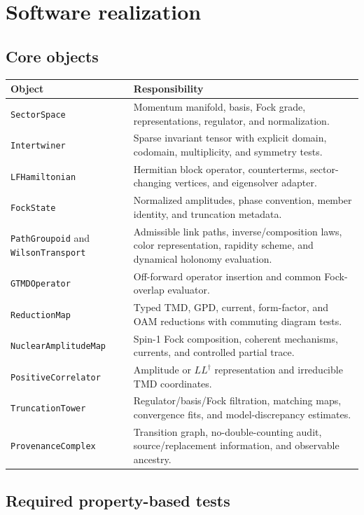 \documentclass[11pt]{article}
\begin{document}
\section{Software realization}

\subsection{Core objects}

\begin{longtable}{L{0.28\textwidth}L{0.64\textwidth}}
\toprule
Object & Responsibility\\
\midrule
\endhead
\texttt{SectorSpace} &
Momentum manifold, basis, Fock grade, representations, regulator, and
normalization.\\
\texttt{Intertwiner} &
Sparse invariant tensor with explicit domain, codomain, multiplicity, and
symmetry tests.\\
\texttt{LFHamiltonian} &
Hermitian block operator, counterterms, sector-changing vertices, and
eigensolver adapter.\\
\texttt{FockState} &
Normalized amplitudes, phase convention, member identity, and truncation
metadata.\\
\texttt{PathGroupoid} and \texttt{WilsonTransport} &
Admissible link paths, inverse/composition laws, color representation,
rapidity scheme, and dynamical holonomy evaluation.\\
\texttt{GTMDOperator} &
Off-forward operator insertion and common Fock-overlap evaluator.\\
\texttt{ReductionMap} &
Typed TMD, GPD, current, form-factor, and OAM reductions with commuting
diagram tests.\\
\texttt{NuclearAmplitudeMap} &
Spin-1 Fock composition, coherent mechanisms, currents, and controlled
partial trace.\\
\texttt{PositiveCorrelator} &
Amplitude or \(LL^\dagger\) representation and irreducible TMD coordinates.\\
\texttt{TruncationTower} &
Regulator/basis/Fock filtration, matching maps, convergence fits, and
model-discrepancy estimates.\\
\texttt{ProvenanceComplex} &
Transition graph, no-double-counting audit, source/replacement information,
and observable ancestry.\\
\bottomrule
\end{longtable}

\subsection{Required property-based tests}
\end{document}
